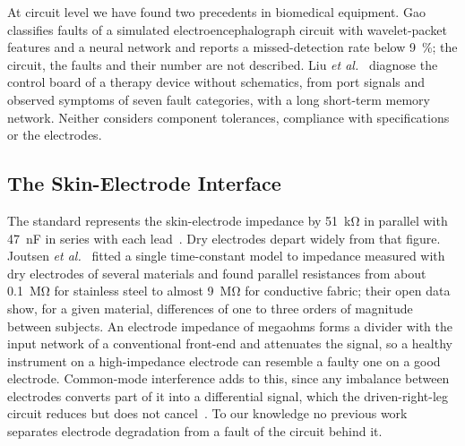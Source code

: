At circuit level we have found two precedents in biomedical equipment. Gao~\cite{gao2025}
classifies faults of a simulated electroencephalograph circuit with wavelet-packet features and a
neural network and reports a missed-detection rate below \SI{9}{\percent}; the circuit, the
faults and their number are not described. Liu \emph{et al.}~\cite{liu2021} diagnose the control
board of a therapy device without schematics, from port signals and observed symptoms of seven
fault categories, with a long short-term memory network. Neither considers component tolerances,
compliance with specifications or the electrodes.

\subsection{The Skin-Electrode Interface}
The standard represents the skin-electrode impedance by \SI{51}{\kilo\ohm} in parallel with
\SI{47}{\nano\farad} in series with each lead~\cite{iec60601225}. Dry electrodes depart widely
from that figure. Joutsen \emph{et al.}~\cite{joutsen2024} fitted a single time-constant model to
impedance measured with dry electrodes of several materials and found parallel resistances from
about \SI{0.1}{\mega\ohm} for stainless steel to almost \SI{9}{\mega\ohm} for conductive fabric;
their open data show, for a given material, differences of one to three orders of magnitude
between subjects. An electrode impedance of megaohms forms a divider with the input network of a
conventional front-end and attenuates the signal, so a healthy instrument on a high-impedance
electrode can resemble a faulty one on a good electrode. Common-mode interference adds to this,
since any imbalance between electrodes converts part of it into a differential signal, which the
driven-right-leg circuit reduces but does not cancel~\cite{winter1983}. To our knowledge no
previous work separates electrode degradation from a fault of the circuit behind it.
